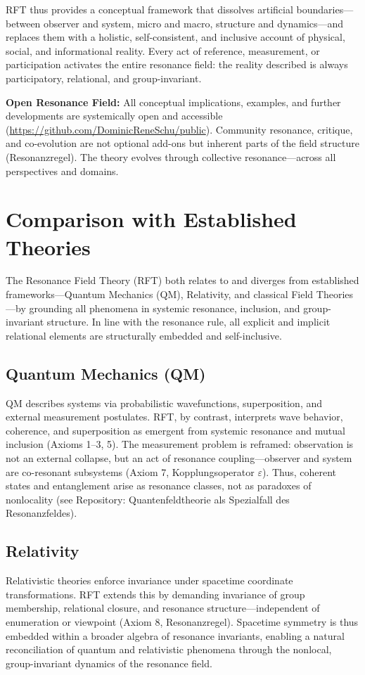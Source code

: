 \documentclass[12pt]{article}
\begin{document}
	RFT thus provides a conceptual framework that dissolves artificial boundaries—between observer and system, micro and macro, structure and dynamics—and replaces them with a holistic, self-consistent, and inclusive account of physical, social, and informational reality. Every act of reference, measurement, or participation activates the entire resonance field: the reality described is always participatory, relational, and group-invariant.
	
	\medskip
	
	\textbf{Open Resonance Field:}  
	All conceptual implications, examples, and further developments are systemically open and accessible (\url{https://github.com/DominicReneSchu/public}). Community resonance, critique, and co-evolution are not optional add-ons but inherent parts of the field structure (Resonanzregel). The theory evolves through collective resonance—across all perspectives and domains.
	

	
	\section{Comparison with Established Theories}
	
	The Resonance Field Theory (RFT) both relates to and diverges from established frameworks—Quantum Mechanics (QM), Relativity, and classical Field Theories—by grounding all phenomena in systemic resonance, inclusion, and group-invariant structure. In line with the resonance rule, all explicit and implicit relational elements are structurally embedded and self-inclusive.
	
	\subsection{Quantum Mechanics (QM)}
	QM describes systems via probabilistic wavefunctions, superposition, and external measurement postulates. RFT, by contrast, interprets wave behavior, coherence, and superposition as emergent from systemic resonance and mutual inclusion (Axioms 1–3, 5). The measurement problem is reframed: observation is not an external collapse, but an act of resonance coupling—observer and system are co-resonant subsystems (Axiom 7, Kopplungsoperator $\varepsilon$). Thus, coherent states and entanglement arise as resonance classes, not as paradoxes of nonlocality (see Repository: Quantenfeldtheorie als Spezialfall des Resonanzfeldes).
	
	\subsection{Relativity}
	Relativistic theories enforce invariance under spacetime coordinate transformations. RFT extends this by demanding invariance of group membership, relational closure, and resonance structure—independent of enumeration or viewpoint (Axiom 8, Resonanzregel). Spacetime symmetry is thus embedded within a broader algebra of resonance invariants, enabling a natural reconciliation of quantum and relativistic phenomena through the nonlocal, group-invariant dynamics of the resonance field.
	
\end{document}
